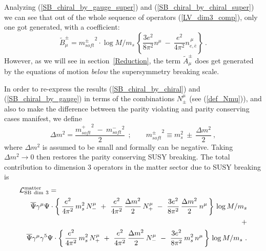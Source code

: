 \documentclass[a4paper,12pt]{article}
\begin{document}
        Analyzing (\ref{SB_chiral_by_gauge_super}) 
	and (\ref{SB_chiral_by_chiral_super})
	we can see that out of the whole sequence of operators
	(\ref{LV_dim3_comp}), only one got generated, with a 
	coefficient:
\begin{equation}
\label{B_mu_coef}
	\widetilde{B}^\pm_\mu = 
	{m_{soft}^\pm}^2 \cdot \log M/m_s\,
	\left \{ 
		\frac{3e^2}
		     {8\pi^2} n^\mu 
		~-~
		\frac{e^2}
		     {4\pi^2} n_{e,\bar{e}}^{\,\mu}
	\right \}~.
\end{equation}
        However, as we will see in section~\ref{Reduction},
	the term $ \widetilde{A}^\pm_\mu $ does get generated
	by the equations of motion {\it below} the supersymmetry
	breaking scale.

	In order to re-express the results (\ref{SB_chiral_by_chiral})
	and (\ref{SB_chiral_by_gauge}) in terms of the combinations
	$ N_\pm^\mu $ (see (\ref{def_Nmu})), and also 
	to make the difference between the parity violating and
	parity conserving cases manifest, we define
\begin{equation}
	\Delta m^2 = \frac{ {m_{soft}^+}^2 ~ - ~ {m_{soft}^-}^2 }
			  {                  2                  }~~;
	\qquad
	{m_{soft}^\pm}^2 \equiv m_s^2 ~\pm~ \frac{\Delta m^2}{2}~,
\end{equation}
	where $ \Delta m^2 $ is assumed to be small and 
	formally can be negative.
	Taking $ \Delta m^2 \to 0 $ then restores the parity conserving
	SUSY breaking.
	The total contribution to dimension 3 operators in the matter
	sector due to SUSY breaking is
\begin{eqnarray}
\nonumber
\lefteqn{
        \mathcal{L}_{\rm{SB\ dim\ 3}}^{\rm matter} = 
	} \\
\nonumber
        &&
	\overline{\Psi} \gamma^\mu \Psi \cdot
	\left\{\,
	        \frac{e^2}{4\pi^2}\, m_s^2\, N_-^\mu 
		~+~
		\frac{e^2}{4\pi^2}\, \frac{\Delta m^2}{2}\, N_+^\mu 
		~-~
		\frac{3e^2}{8\pi^2}\, \frac{\Delta m^2}{2}\, n^\mu
	       \,
	\right\}\, \log M/m_s \\
\label{LV_induced_dim3}
	&& \qquad\qquad\qquad\qquad\qquad\qquad\qquad\ + \\
\nonumber
	&&
	\overline{\Psi} \gamma^\mu \gamma^5 \Psi \cdot
	\left\{\,
	        \frac{e^2}{4\pi^2}\, m_s^2\, N_+^\mu 
		~+~
		\frac{e^2}{4\pi^2}\, \frac{\Delta m^2}{2}\, N_-^\mu 
		~-~
		\frac{3e^2}{8\pi^2}\, m_s^2\, n^\mu
	       \,
	\right\}\, \log M/m_s~.
\end{eqnarray}
\end{document}
